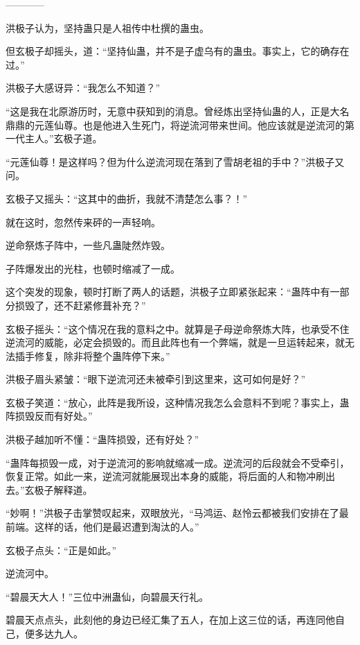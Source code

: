 
\begin{this_body}

------------

洪极子认为，坚持蛊只是人祖传中杜撰的蛊虫。

但玄极子却摇头，道：“坚持仙蛊，并不是子虚乌有的蛊虫。事实上，它的确存在过。”

洪极子大感讶异：“我怎么不知道？”

“这是我在北原游历时，无意中获知到的消息。曾经炼出坚持仙蛊的人，正是大名鼎鼎的元莲仙尊。也是他进入生死门，将逆流河带来世间。他应该就是逆流河的第一代主人。”玄极子道。

“元莲仙尊！是这样吗？但为什么逆流河现在落到了雪胡老祖的手中？”洪极子又问。

玄极子又摇头：“这其中的曲折，我就不清楚怎么事？！”

就在这时，忽然传来砰的一声轻响。

逆命祭炼子阵中，一些凡蛊陡然炸毁。

子阵爆发出的光柱，也顿时缩减了一成。

这个突发的现象，顿时打断了两人的话题，洪极子立即紧张起来：“蛊阵中有一部分损毁了，还不赶紧修葺补充？”

玄极子摇头：“这个情况在我的意料之中。就算是子母逆命祭炼大阵，也承受不住逆流河的威能，必定会损毁的。而且此阵也有一个弊端，就是一旦运转起来，就无法插手修复，除非将整个蛊阵停下来。”

洪极子眉头紧皱：“眼下逆流河还未被牵引到这里来，这可如何是好？”

玄极子笑道：“放心，此阵是我所设，这种情况我怎么会意料不到呢？事实上，蛊阵损毁反而有好处。”

洪极子越加听不懂：“蛊阵损毁，还有好处？”

“蛊阵每损毁一成，对于逆流河的影响就缩减一成。逆流河的后段就会不受牵引，恢复正常。如此一来，逆流河就能展现出本身的威能，将后面的人和物冲刷出去。”玄极子解释道。

“妙啊！”洪极子击掌赞叹起来，双眼放光，“马鸿运、赵怜云都被我们安排在了最前端。这样的话，他们是最迟遭到淘汰的人。”

玄极子点头：“正是如此。”

逆流河中。

“碧晨天大人！”三位中洲蛊仙，向碧晨天行礼。

碧晨天点点头，此刻他的身边已经汇集了五人，在加上这三位的话，再连同他自己，便多达九人。


\end{this_body}
